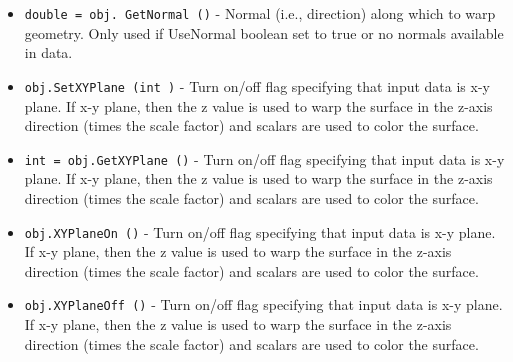 \begin{itemize}
\item  \verb|double = obj. GetNormal ()| -  Normal (i.e., direction) along which to warp geometry. Only used
 if UseNormal boolean set to true or no normals available in data.

\item  \verb|obj.SetXYPlane (int )| -  Turn on/off flag specifying that input data is x-y plane. If x-y plane,
 then the z value is used to warp the surface in the z-axis direction 
 (times the scale factor) and scalars are used to color the surface.

\item  \verb|int = obj.GetXYPlane ()| -  Turn on/off flag specifying that input data is x-y plane. If x-y plane,
 then the z value is used to warp the surface in the z-axis direction 
 (times the scale factor) and scalars are used to color the surface.

\item  \verb|obj.XYPlaneOn ()| -  Turn on/off flag specifying that input data is x-y plane. If x-y plane,
 then the z value is used to warp the surface in the z-axis direction 
 (times the scale factor) and scalars are used to color the surface.

\item  \verb|obj.XYPlaneOff ()| -  Turn on/off flag specifying that input data is x-y plane. If x-y plane,
 then the z value is used to warp the surface in the z-axis direction 
 (times the scale factor) and scalars are used to color the surface.

\end{itemize}

